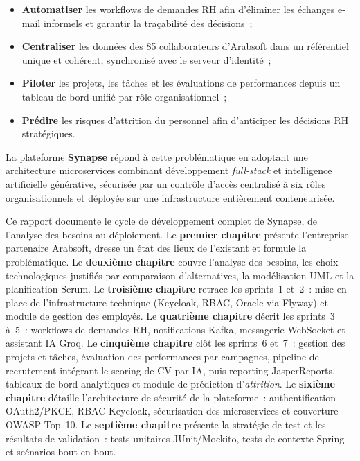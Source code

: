 \documentclass[12pt,a4paper,oneside]{report}
\begin{document}
\begin{itemize}[leftmargin=*,nosep]
  \item \textbf{Automatiser} les workflows de demandes RH afin d'éliminer
        les échanges e-mail informels et garantir la traçabilité des décisions~;
  \item \textbf{Centraliser} les données des 85 collaborateurs d'Arabsoft dans
        un référentiel unique et cohérent, synchronisé avec le serveur d'identité~;
  \item \textbf{Piloter} les projets, les tâches et les évaluations de performances
        depuis un tableau de bord unifié par rôle organisationnel~;
  \item \textbf{Prédire} les risques d'attrition du personnel afin d'anticiper
        les décisions RH stratégiques.
\end{itemize}

La plateforme \textbf{Synapse} répond à cette problématique en adoptant une architecture microservices combinant développement \textit{full-stack} et intelligence artificielle générative, sécurisée par un contrôle d'accès centralisé à six rôles organisationnels et déployée sur une infrastructure entièrement conteneurisée.

Ce rapport documente le cycle de développement complet de Synapse, de l'analyse
des besoins au déploiement. Le \textbf{premier chapitre} présente l'entreprise
partenaire Arabsoft, dresse un état des lieux de l'existant et formule la
problématique. Le \textbf{deuxième chapitre} couvre l'analyse des besoins, les
choix technologiques justifiés par comparaison d'alternatives, la modélisation
UML et la planification Scrum. Le \textbf{troisième chapitre} retrace les
sprints~1 et~2~: mise en place de l'infrastructure technique (Keycloak, RBAC,
Oracle via Flyway) et module de gestion des employés. Le
\textbf{quatrième chapitre} décrit les sprints~3 à~5~: workflows de demandes
RH, notifications Kafka, messagerie WebSocket et assistant IA Groq. Le
\textbf{cinquième chapitre} clôt les sprints~6 et~7~: gestion des projets et tâches,
évaluation des performances par campagnes, pipeline de recrutement intégrant le
scoring de CV par IA, puis reporting JasperReports, tableaux de bord analytiques et
module de prédiction d'\textit{attrition}. Le \textbf{sixième
chapitre} détaille l'architecture de sécurité de la plateforme~: authentification
OAuth2/PKCE, RBAC Keycloak, sécurisation des microservices et couverture OWASP
Top~10. Le \textbf{septième chapitre} présente la stratégie de test et les
résultats de validation~: tests unitaires JUnit/Mockito, tests de contexte Spring
et scénarios bout-en-bout.
\end{document}
